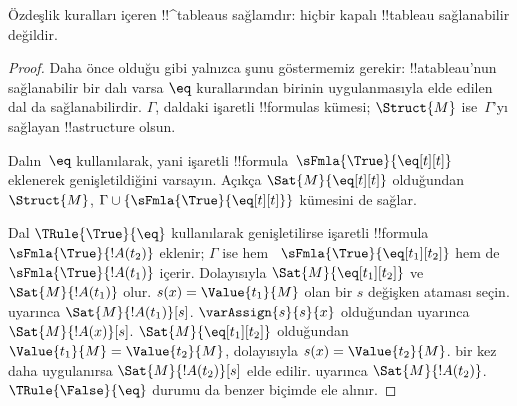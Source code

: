 \documentclass[../../../include/open-logic-section]{subfiles}
\begin{document}


\begin{prop}
Özdeşlik kuralları içeren !!^{tableau}s sağlamdır: hiçbir kapalı !!{tableau}
sağlanabilir değildir.
\end{prop}

\begin{proof}
Daha önce olduğu gibi yalnızca şunu göstermemiz gerekir: !!a{tableau}'nun
sağlanabilir bir dalı varsa $\eq$ kurallarından birinin uygulanmasıyla elde
edilen dal da sağlanabilirdir. $\Gamma$, daldaki işaretli !!{formula}s
kümesi; $\Struct{M}$ ise~$\Gamma$'yı sağlayan !!a{structure} olsun.

Dalın~$\eq$ kullanılarak, yani işaretli
!!{formula}~$\sFmla{\True}{\eq[t][t]}$ eklenerek genişletildiğini varsayın.
Açıkça $\Sat{M}{\eq[t][t]}$ olduğundan $\Struct{M}$,
$\Gamma \cup \{\sFmla{\True}{\eq[t][t]}\}$ kümesini de sağlar.

Dal $\TRule{\True}{\eq}$ kullanılarak genişletilirse işaretli
!!{formula}~$\sFmla{\True}{!A(t_2)}$ eklenir; $\Gamma$ ise hem
~$\sFmla{\True}{\eq[t_1][t_2]}$ hem de $\sFmla{\True}{!A(t_1)}$ içerir.
Dolayısıyla $\Sat{M}{\eq[t_1][t_2]}$ ve $\Sat{M}{!A(t_1)}$ olur.
$s(x) = \Value{t_1}{M}$ olan bir $s$ değişken ataması seçin.
 uyarınca
$\Sat{M}{!A(t_1)}[s]$. $\varAssign{s}{s}{x}$ olduğundan
 uyarınca $\Sat{M}{!A(x)}[s]$.
$\Sat{M}{\eq[t_1][t_2]}$ olduğundan
$\Value{t_1}{M} = \Value{t_2}{M}$, dolayısıyla
$s(x) = \Value{t_2}{M}$.  bir kez daha
uygulanırsa $\Sat{M}{!A(t_2)}[s]$ elde edilir.
 uyarınca
$\Sat{M}{!A(t_2)}$. $\TRule{\False}{\eq}$ durumu da benzer biçimde ele
alınır.
\end{proof}
\end{document}
